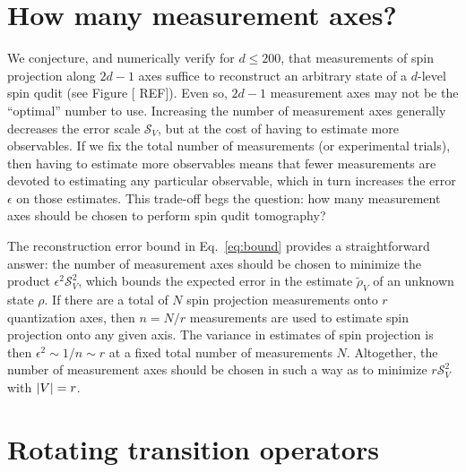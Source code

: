\documentclass[notitlepage,twocolumn]{revtex4-2}
\newcommand{\1}{\mathds{1}}
\renewcommand{\S}{\mathcal{S}}
\newcommand{\red}[1]{{\color{red} #1}}
\begin{document}
\section{How many measurement axes?}
\label{sec:axes}

We conjecture, and numerically verify for $d\le200$, that measurements of spin projection along $2d-1$ axes suffice to reconstruct an arbitrary state of a $d$-level spin qudit (see Figure [\red{REF}]).
Even so, $2d-1$ measurement axes may not be the ``optimal'' number to use.
Increasing the number of measurement axes generally decreases the error scale $\S_V$, but at the cost of having to estimate more observables.
If we fix the total number of measurements (or experimental trials), then having to estimate more observables means that fewer measurements are devoted to estimating any particular observable, which in turn increases the error $\epsilon$ on those estimates.
This trade-off begs the question: how many measurement axes should be chosen to perform spin qudit tomography?

The reconstruction error bound in Eq.~\eqref{eq:bound} provides a straightforward answer: the number of measurement axes should be chosen to minimize the product $\epsilon^2\S_V^2$, which bounds the expected error in the estimate $\tilde\rho_V$ of an unknown state $\rho$.
If there are a total of $N$ spin projection measurements onto $r$ quantization axes, then $n=N/r$ measurements are used to estimate spin projection onto any given axis.
The variance in estimates of spin projection is then $\epsilon^2\sim1/n\sim r$ at a fixed total number of measurements $N$.
Altogether, the number of measurement axes should be chosen in such a way as to minimize $r\S_V^2$ with $\abs{V}=r$.







\onecolumngrid
\appendix

\section{Rotating transition operators}
\label{sec:rotations}
\end{document}
